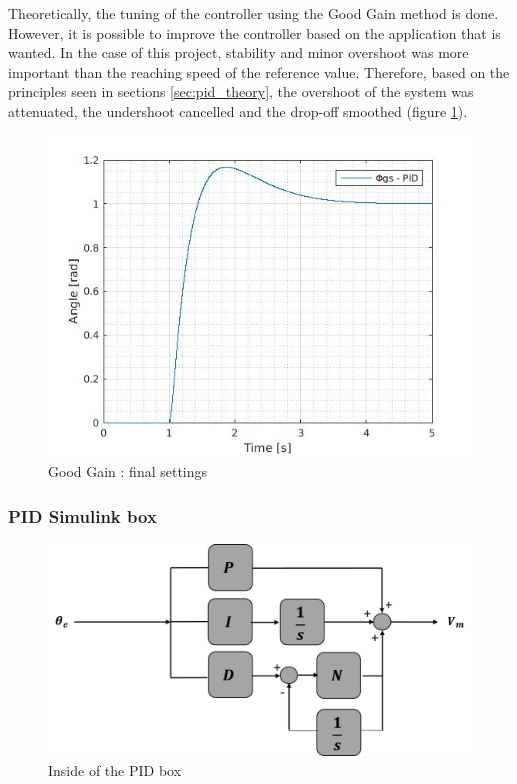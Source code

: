 \vspace{5mm}

Theoretically, the tuning of the controller using the Good Gain method is done. However, it is possible to improve the controller based on the application that is wanted. In the case of this project, stability and minor overshoot was more important than the reaching speed of the reference value. Therefore, based on the principles seen in sections \ref{sec:pid_theory}, the overshoot of the system was attenuated, the undershoot cancelled and the drop-off smoothed (figure \ref{finalGG}).

\begin{figure}[H]
  \centering
  \includegraphics[scale=0.5]{figures/GG5.jpg}
  \caption[LABEL] {Good Gain : final settings}
  \label{finalGG}
\end{figure}


  
\subsubsection{PID Simulink box}
\begin{figure}[H]
\centering
\includegraphics[scale=0.4]{figures/controller_box.png}
\caption{Inside of the PID box}
\label{dcmotor_circuit}
\end{figure}

